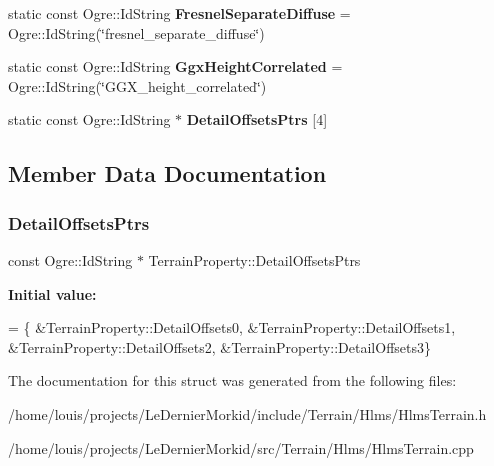 \begin{DoxyCompactItemize}
static const Ogre\+::\+Id\+String {\bfseries Fresnel\+Separate\+Diffuse} = Ogre\+::\+Id\+String(\char`\"{}fresnel\+\_\+separate\+\_\+diffuse\char`\"{})
\item 
\mbox{\label{struct_terrain_property_ac5d4c929036f2bdb2959da73f70a2ab6}} 
static const Ogre\+::\+Id\+String {\bfseries Ggx\+Height\+Correlated} = Ogre\+::\+Id\+String(\char`\"{}G\+G\+X\+\_\+height\+\_\+correlated\char`\"{})
\item 
static const Ogre\+::\+Id\+String $\ast$ {\bfseries Detail\+Offsets\+Ptrs} \mbox{[}4\mbox{]}
\end{DoxyCompactItemize}


\subsection{Member Data Documentation}
\mbox{\label{struct_terrain_property_ac7f6e9bf302538090e3c9155799304b8}} 
\subsubsection{\texorpdfstring{Detail\+Offsets\+Ptrs}{DetailOffsetsPtrs}}
{\footnotesize\ttfamily const Ogre\+::\+Id\+String $\ast$ Terrain\+Property\+::\+Detail\+Offsets\+Ptrs\hspace{0.3cm}{\ttfamily [static]}}

{\bfseries Initial value\+:}
\begin{DoxyCode}
=
        \{
                &TerrainProperty::DetailOffsets0,
                &TerrainProperty::DetailOffsets1,
                &TerrainProperty::DetailOffsets2,
                &TerrainProperty::DetailOffsets3\}
\end{DoxyCode}


The documentation for this struct was generated from the following files\+:\begin{DoxyCompactItemize}
\item 
/home/louis/projects/\+Le\+Dernier\+Morkid/include/\+Terrain/\+Hlms/Hlms\+Terrain.\+h\item 
/home/louis/projects/\+Le\+Dernier\+Morkid/src/\+Terrain/\+Hlms/Hlms\+Terrain.\+cpp\end{DoxyCompactItemize}
